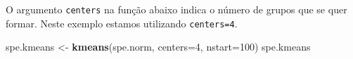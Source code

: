 \documentclass[
]{book}
\newenvironment{Shaded}{\begin{snugshade}}{\end{snugshade}}
\newcommand{\CommentTok}[1]{\textcolor[rgb]{0.56,0.35,0.01}{\textit{#1}}}
\newcommand{\DataTypeTok}[1]{\textcolor[rgb]{0.13,0.29,0.53}{#1}}
\newcommand{\DecValTok}[1]{\textcolor[rgb]{0.00,0.00,0.81}{#1}}
\newcommand{\KeywordTok}[1]{\textcolor[rgb]{0.13,0.29,0.53}{\textbf{#1}}}
\newcommand{\NormalTok}[1]{#1}
\newcommand{\OperatorTok}[1]{\textcolor[rgb]{0.81,0.36,0.00}{\textbf{#1}}}
\newcommand{\StringTok}[1]{\textcolor[rgb]{0.31,0.60,0.02}{#1}}
\begin{document}
\begin{Shaded}
\end{Shaded}

O argumento \texttt{centers} na função abaixo indica o número de grupos que se quer formar. Neste exemplo estamos utilizando \texttt{centers=4}.

\begin{Shaded}
\begin{Highlighting}[]
\NormalTok{spe.kmeans <-}\StringTok{ }\KeywordTok{kmeans}\NormalTok{(spe.norm, }\DataTypeTok{centers=}\DecValTok{4}\NormalTok{, }\DataTypeTok{nstart=}\DecValTok{100}\NormalTok{)}
\NormalTok{spe.kmeans}
\end{Highlighting}
\end{Shaded}
\end{document}

